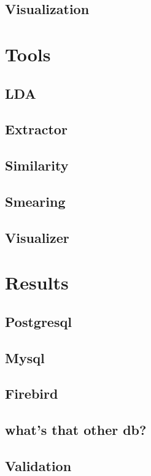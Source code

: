 \documentclass{report}
\begin{document}
\subsection{Visualization}
\section{Tools}
\subsection{LDA}
\subsection{Extractor}
\subsection{Similarity}
\subsection{Smearing}
\subsection{Visualizer}
\section{Results}
\subsection{Postgresql}
\subsection{Mysql}
\subsection{Firebird}
\subsection{ what's that other db?}
\subsection{Validation}
\end{document}
